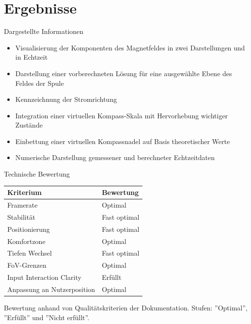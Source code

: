 \part{Ergebnisse}
\label{part:results}
\begin{frame}[fragile]{Dargestellte Informationen}
\begin{itemize}
	\item Visualisierung der Komponenten des Magnetfeldes in zwei Darstellungen und in Echtzeit
	\item Darstellung einer vorberechneten Lösung für eine ausgewählte Ebene des Feldes der Spule
	\item Kennzeichnung der Stromrichtung
	\item Integration einer virtuellen Kompass-Skala mit Hervorhebung wichtiger Zustände
	\item Einbettung einer virtuellen Kompassnadel auf Basis theoretischer Werte
	\item Numerische Darstellung gemessener und berechneter Echtzeitdaten
\end{itemize}
\end{frame}

\begin{frame}[fragile]{Technische Bewertung}

\setlength\extrarowheight{1pt}
\def\arraystretch{1.1}
\begin{table}
	\centering
	\begin{tabular}{m{5.0cm}|l}
		Kriterium & Bewertung \\
		\hline
		\hline
		Framerate & Optimal\\
		\hline
		Stabilität & Fast optimal\\
		\hline
		Positionierung & Fast optimal\\
		\hline
		Komfortzone & Optimal\\
		\hline
		Tiefen Wechsel & Fast optimal\\
		\hline
		FoV-Grenzen & Optimal\\
		\hline
		Input Interaction Clarity & Erfüllt\\
		\hline
		Anpassung an Nutzerposition & Optimal\\
	\end{tabular}
\end{table}
\scriptsize Bewertung anhand von Qualitätskriterien der Dokumentation. Stufen: ''Optimal'', ''Erfüllt'' und ''Nicht erfüllt''.
\end{frame}

